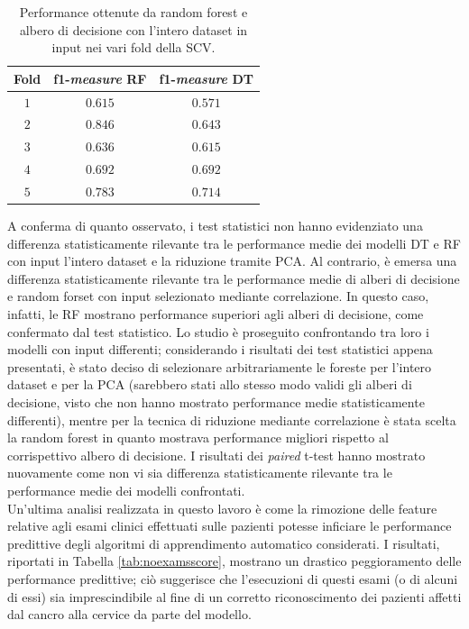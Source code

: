\begin{table}
	\centering
	\caption{Performance ottenute da random forest e albero di decisione con l'intero dataset in input nei vari fold della SCV.}
	\label{tab:f1fold}
	\begin{tabular}{|c|c|c|}
		\hline 
		Fold & f1-\textit{measure} RF & f1-\textit{measure} DT \\ 
		\hline 
		$1$ & $0.615$  & $0.571$\\ 
		\hline 
		$2$ & $0.846$ & $0.643$\\ 
		\hline 
		$3$ & $0.636$ & $0.615$\\ 
		\hline 
		$4$ & $0.692$ & $0.692$\\ 
		\hline 
		$5$ & $0.783$ & $0.714$\\ 
		\hline 
	\end{tabular} 
\end{table}
A conferma di quanto osservato, i test statistici non hanno evidenziato una differenza statisticamente rilevante tra le performance medie dei modelli DT e RF con input l'intero dataset e la riduzione tramite PCA.
Al contrario, è emersa una differenza statisticamente rilevante tra le performance medie di alberi di decisione e random forset con input selezionato mediante correlazione.
In questo caso, infatti, le RF mostrano performance superiori agli alberi di decisione, come confermato dal test statistico.
Lo studio è proseguito confrontando tra loro i modelli con input differenti; considerando i risultati dei test statistici appena presentati, è stato deciso di selezionare arbitrariamente le foreste per l'intero dataset e per la PCA (sarebbero stati allo stesso modo validi gli alberi di decisione, visto che non hanno mostrato performance medie statisticamente differenti), mentre per la tecnica di riduzione mediante correlazione è stata scelta la random forest in quanto mostrava performance migliori rispetto al corrispettivo albero di decisione.
I risultati dei \textit{paired} t-test hanno mostrato nuovamente come non vi sia differenza statisticamente rilevante tra le performance medie dei modelli confrontati.\\
Un'ultima analisi realizzata in questo lavoro è come la rimozione delle feature relative agli esami clinici effettuati sulle pazienti potesse inficiare le performance predittive degli algoritmi di apprendimento automatico considerati. 
I risultati, riportati in Tabella \ref{tab:noexamsscore}, mostrano un drastico peggioramento delle performance predittive; ciò suggerisce che l'esecuzioni di questi esami (o di alcuni di essi) sia imprescindibile al fine di un corretto riconoscimento dei pazienti affetti dal cancro alla cervice da parte del modello. 
